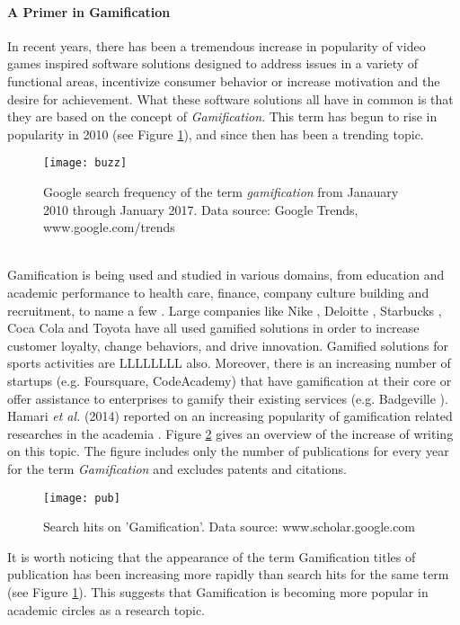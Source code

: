 \paragraph{A Primer in Gamification}
In recent years, there has been a tremendous increase in popularity of video games inspired software solutions designed to address issues in a variety of functional areas, incentivize consumer behavior or increase motivation and the desire for achievement. What these software solutions all have in common is that they are based on the concept of \textit{Gamification}. This term has begun to rise in popularity in 2010 (see Figure \ref{fig:buzz}), and since then has been a trending topic. %
\begin{figure}[h]
    \centering
    \texttt{[image: buzz]}
    \caption{Google search frequency of the term \textit{gamification} from Janauary 2010 through January 2017. Data source: Google Trends, www.google.com/trends}
    \label{fig:buzz}
\end{figure}\\
Gamification is being used and studied in various domains, from education and academic performance to health care, finance, company culture building and recruitment, to name a few \cite{gamificationExamples, gamificationWiki, enterpriseGamify}. Large companies like Nike \cite{nikePlus}, Deloitte \cite{deloitte}, Starbucks \cite{starbucks}, Coca Cola \cite{coke} and Toyota \cite{toyota} have all used gamified solutions in order to increase customer loyalty, change behaviors, 
and drive innovation. Gamified solutions for sports activities are LLLLLLLL also.  %
Moreover, there is an increasing number of startups (e.g. Foursquare, CodeAcademy) that have gamification  at  their  core \cite{codeacademy} or offer assistance to enterprises to gamify their existing services (e.g. Badgeville \cite{badgeville}). Hamari \textit{et al.} (2014) reported on an increasing popularity of gamification related researches in the academia \cite{hamari2014does}. Figure \ref{fig:pub} gives an overview of the increase of writing on this topic. The figure includes only the number of publications for every year for the term \textit{Gamification} and excludes patents and citations. 
\begin{figure}[h]
    \centering
    \texttt{[image: pub]}
    \caption{Search hits on 'Gamification'. Data source: www.scholar.google.com}
    \label{fig:pub}
\end{figure}
It is worth noticing that the appearance of the term Gamification titles of publication has been increasing more rapidly than search hits for the same term (see Figure \ref{fig:buzz}). This suggests that Gamification is becoming more popular in academic circles as a research topic.%
